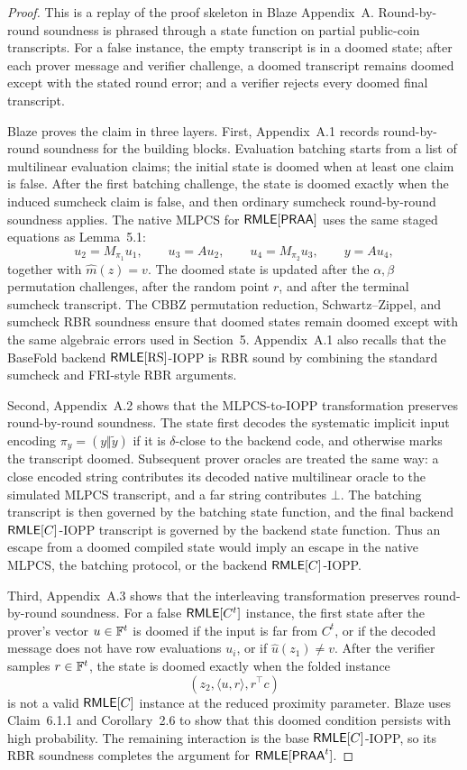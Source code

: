 \begin{proof}
This is a replay of the proof skeleton in Blaze Appendix~A.  Round-by-round
soundness is phrased through a state function on partial public-coin
transcripts.  For a false instance, the empty transcript is in a doomed state;
after each prover message and verifier challenge, a doomed transcript remains
doomed except with the stated round error; and a verifier rejects every doomed
final transcript.

Blaze proves the claim in three layers.  First, Appendix~A.1 records
round-by-round soundness for the building blocks.  Evaluation batching starts
from a list of multilinear evaluation claims; the initial state is doomed when
at least one claim is false.  After the first batching challenge, the state is
doomed exactly when the induced sumcheck claim is false, and then ordinary
sumcheck round-by-round soundness applies.  The native MLPCS for
\(\mathsf{RMLE}[\mathsf{PRAA}]\) uses the same staged equations as Lemma~5.1:
\[
  u_2=M_{\pi_1}u_1,\qquad
  u_3=A u_2,\qquad
  u_4=M_{\pi_2}u_3,\qquad
  y=A u_4,
\]
together with \(\widehat m(z)=v\).  The doomed state is updated after the
\(\alpha,\beta\) permutation challenges, after the random point \(r\), and
after the terminal sumcheck transcript.  The CBBZ permutation reduction,
Schwartz--Zippel, and sumcheck RBR soundness ensure that doomed states remain
doomed except with the same algebraic errors used in Section~5.  Appendix~A.1
also recalls that the BaseFold backend \(\mathsf{RMLE}[\mathrm{RS}]\)-IOPP is RBR
sound by combining the standard sumcheck and FRI-style RBR arguments.

Second, Appendix~A.2 shows that the MLPCS-to-IOPP transformation preserves
round-by-round soundness.  The state first decodes the systematic implicit
input encoding \(\pi_y=(y\Vert\widetilde y)\) if it is \(\delta\)-close to the
backend code, and otherwise marks the transcript doomed.  Subsequent prover
oracles are treated the same way: a close encoded string contributes its
decoded native multilinear oracle to the simulated MLPCS transcript, and a far
string contributes \(\bot\).  The batching transcript is then governed by the
batching state function, and the final backend \(\mathsf{RMLE}[C]\)-IOPP transcript is
governed by the backend state function.  Thus an escape from a doomed compiled
state would imply an escape in the native MLPCS, the batching protocol, or the
backend \(\mathsf{RMLE}[C]\)-IOPP.

Third, Appendix~A.3 shows that the interleaving transformation preserves
round-by-round soundness.  For a false \(\mathsf{RMLE}[C^t]\) instance, the first state
after the prover's vector \(u\in\mathbb{F}^t\) is doomed if the input is far from
\(C^t\), or if the decoded message does not have row evaluations \(u_i\), or if
\(\widehat u(z_1)\ne v\).  After the verifier samples \(r\in\mathbb{F}^t\), the state
is doomed exactly when the folded instance
\[
  (z_2,\langle u,r\rangle,r^\top c)
\]
is not a valid \(\mathsf{RMLE}[C]\) instance at the reduced proximity parameter.  Blaze
uses Claim~6.1.1 and Corollary~2.6 to show that this doomed condition persists
with high probability.  The remaining interaction is the base
\(\mathsf{RMLE}[C]\)-IOPP, so its RBR soundness completes the argument for
\(\mathsf{RMLE}[\mathsf{PRAA}^t]\).
\end{proof}

